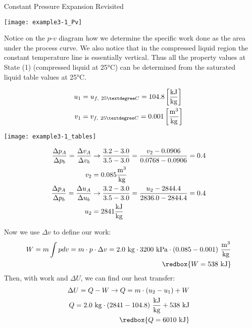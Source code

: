 \begin{example}[label={ex:constantPressureRevisited}]{Constant Pressure Expansion Revisited}
\begin{center}
\texttt{[image: example3-1\_Pv]}
\end{center}

Notice on the $p$-$v$ diagram how we determine the specific work done as the area under the process curve. We also notice that in the compressed liquid region the constant temperature line is essentially vertical. Thus all the property values at State (1) (compressed liquid at 25°C) can be determined from the saturated liquid table values at 25°C.

\begin{align*}
  u_1 &= u_{f,\ 25°C}=104.8 \left[\frac{\rm kJ}{\rm kg}\right]\\
  v_1 &= v_{f,\ 25°C}=0.001 \left[\frac{\rm m^3}{\rm kg}\right]
\end{align*}

\begin{center}
\texttt{[image: example3-1\_tables]}
\end{center}

\begin{align*}
  \frac{\Delta p_A}{\Delta p_b} = \frac{\Delta v_A}{\Delta v_b} &\rightarrow \frac{3.2 - 3.0}{3.5-3.0} = \frac{v_2-0.0906}{0.0768-0.0906} = 0.4\\
  v_2 &= 0.085 \frac{\rm m^3}{\rm kg} \\
  \frac{\Delta p_A}{\Delta p_b} = \frac{\Delta u_A}{\Delta u_b} &\rightarrow \frac{3.2 - 3.0}{3.5-3.0} = \frac{u_2-2844.4}{2836.0-2844.4} = 0.4\\
  u_2 &= 2841 \frac{\rm kJ}{\rm kg}
\end{align*}

Now we use $\Delta v$ to define our work:
\begin{align*}
  W = m \int p dv = m\cdot p \cdot \Delta v = 2.0\ {\rm kg} \cdot 3200\ {\rm kPa} \cdot (0.085 - 0.001)\ \frac{\rm m^3}{\rm kg} \\
  \redbox{W = 538\ {\rm kJ}}
\end{align*}
Then, with work and $\Delta U$, we can find our heat transfer:
\begin{align*}
  \Delta U = Q - W \rightarrow Q = m\cdot (u_2 - u_1) + W \\
  Q = 2.0\ {\rm kg} \cdot (2841 - 104.8)\ \frac{\rm kJ}{\rm kg} + 538\ {\rm kJ} \\
   \redbox{Q = 6010\ {\rm kJ}}
\end{align*}
\end{example}

